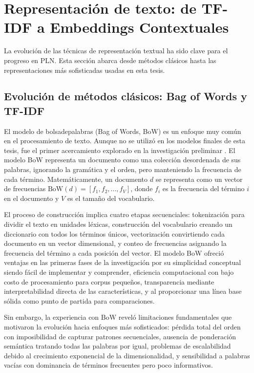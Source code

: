 \section{Representación de texto: de TF-IDF a Embeddings Contextuales}
\label{sec:representacion_texto}

La evolución de las técnicas de representación textual ha sido clave para el progreso en PLN. Esta sección abarca desde métodos clásicos hasta las representaciones más sofisticadas usadas en esta tesis.

\subsection{Evolución de métodos clásicos: Bag of Words y TF-IDF}

El modelo de \gls{bolsadepalabras} (Bag of Words, BoW) es un enfoque muy común en el procesamiento de texto. Aunque no se utilizó en los modelos finales de esta tesis, fue el primer acercamiento explorado en la investigación preliminar \cite{hurtado2024calibracion}. El modelo BoW representa un documento como una colección desordenada de sus palabras, ignorando la gramática y el orden, pero manteniendo la frecuencia de cada término. Matemáticamente, un documento $d$ se representa como un vector de frecuencias $\text{BoW}(d) = [f_1, f_2, ..., f_V]$, donde $f_i$ es la frecuencia del término $i$ en el documento y $V$ es el tamaño del vocabulario.

El proceso de construcción implica cuatro etapas secuenciales: tokenización para dividir el texto en unidades léxicas, construcción del vocabulario creando un diccionario con todos los términos únicos, vectorización convirtiendo cada documento en un vector dimensional, y conteo de frecuencias asignando la frecuencia del término a cada posición del vector. El modelo BoW ofreció ventajas en las primeras fases de la investigación por su simplicidad conceptual siendo fácil de implementar y comprender, eficiencia computacional con bajo costo de procesamiento para corpus pequeños, transparencia mediante interpretabilidad directa de las características, y al proporcionar una línea base sólida como punto de partida para comparaciones.

Sin embargo, la experiencia con BoW reveló limitaciones fundamentales que motivaron la evolución hacia enfoques más sofisticados: pérdida total del orden con imposibilidad de capturar patrones secuenciales, ausencia de ponderación semántica tratando todas las palabras por igual, problemas de escalabilidad debido al crecimiento exponencial de la dimensionalidad, y sensibilidad a palabras vacías con dominancia de términos frecuentes pero poco informativos.

